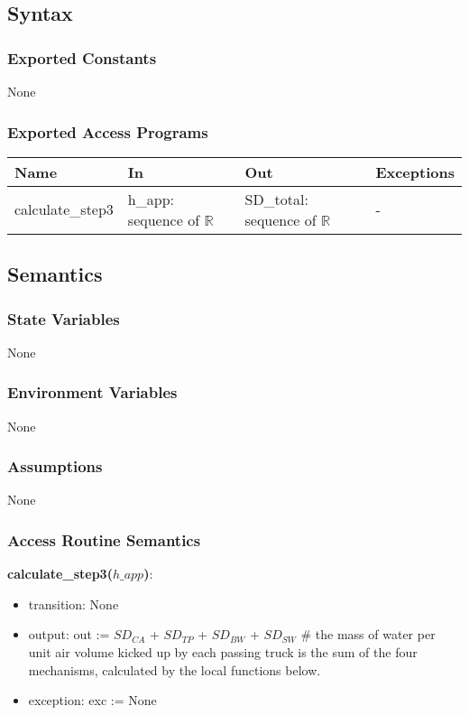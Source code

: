 \documentclass[12pt, titlepage]{article}
\begin{document}
\subsection{Syntax}

\subsubsection{Exported Constants}
None
\subsubsection{Exported Access Programs}

\begin{center}
\begin{tabular}{p{2.5cm} p{4.5cm} p{4.5cm} p{2cm}}
\hline
\textbf{Name} & \textbf{In} & \textbf{Out} & \textbf{Exceptions} \\
\hline
calculate\_step3 & h\_app: sequence of $\mathbb{R}$ & SD\_total: sequence of $\mathbb{R}$ & - \\
\hline
\end{tabular}
\end{center}

\subsection{Semantics}

\subsubsection{State Variables}
None
\subsubsection{Environment Variables}
None
\subsubsection{Assumptions}
None
\subsubsection{Access Routine Semantics}

\noindent \textbf{calculate\_step3($h\_app$)}:
\begin{itemize}
\item transition: None
\item output: out := $\mathit{SD_{CA}}$ + $\mathit{SD_{TP}}$ + $\mathit{SD_{BW}}$ + $\mathit{SD_{SW}}$ \# the mass of water per unit air volume kicked up by each passing truck is the sum of the four mechanisms, calculated by the local functions below.
\item exception: exc := None
\end{itemize}
\end{document}

